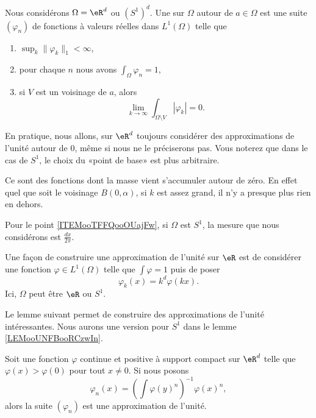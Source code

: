 \begin{definition}       \label{DEFooEFGNooOREmBb}
	Nous considérons \( \Omega=\eR^d\) ou \( (S^1)^d\). Une  sur \( \Omega\) autour de \( a\in \Omega\) est une suite \( (\varphi_n)\) de fonctions à valeurs réelles dans \( L^1(\Omega)\) telle que
	\begin{enumerate}
		\item
		      \( \sup_k \| \varphi_k \|_1 <\infty\),
		\item   \label{ITEMooGVRQooHDbrcf}
		      pour chaque \( n\) nous avons \( \int_{\Omega}\varphi_n=1\),
		\item
		      si \( V\) est un voisinage de \( a\), alors
		      \begin{equation}
			      \lim_{k\to \infty} \int_{\Omega\setminus V}| \varphi_k |=0.
		      \end{equation}
	\end{enumerate}
	En pratique, nous allons, sur \( \eR^d\) toujours considérer des approximations de l'unité autour de \( 0\), même si nous ne le préciserons pas. Vous noterez que dans le cas de \( S^1\), le choix du «point de base» est plus arbitraire.
\end{definition}
Ce sont des fonctions dont la masse vient s'accumuler autour de zéro. En effet quel que soit le voisinage \( B(0,\alpha)\), si \( k\) est assez grand, il n'y a presque plus rien en dehors.

Pour le point \eqref{ITEMooTFFQooOUajFw}, si \( \Omega\) est \( S^1\), la mesure que nous considérons est \( \frac{ dx }{ 2\pi }\).

\begin{example}
	Une façon de construire une approximation de l'unité sur \( \eR\) est de considérer une fonction \( \varphi\in L^1(\Omega)\) telle que \( \int\varphi=1\) puis de poser
	\begin{equation}
		\varphi_k(x)=k^d\varphi(kx).
	\end{equation}
	Ici, \( \Omega\) peut être \( \eR\) ou \( S^1\).
\end{example}

Le lemme suivant permet de construire des approximations de l'unité intéressantes. Nous aurons une version pour \( S^1\) dans le lemme \ref{LEMooUNFBooRCzwIn}.
\begin{lemma}   \label{LemCNjIYhv}
	Soit une fonction \( \varphi\) continue et positive à support compact sur \( \eR^d\) telle que \( \varphi(x)>\varphi(0)\) pour tout \( x\neq 0\). Si nous posons
	\begin{equation}
		\varphi_n(x)=\left( \int\varphi(y)^n \right)^{-1}\varphi(x)^n,
	\end{equation}
	alors la suite \( (\varphi_n)\) est une approximation de l'unité.
\end{lemma}

